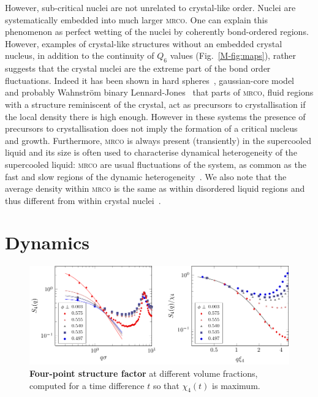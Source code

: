 \documentclass[prl,twocolumn,notitlepage]{revtex4-1}
\begin{document}
However, sub-critical nuclei are not unrelated to crystal-like order. Nuclei are systematically embedded into much larger \textsc{mrco}. One can explain this phenomenon as perfect wetting of the nuclei by coherently bond-ordered regions. However, examples of crystal-like structures without an embedded crystal nucleus, in addition to the continuity of $Q_6$ values (Fig.~\ref{M-fig:maps}), rather suggests that the crystal nuclei are the extreme part of the bond order fluctuations. Indeed it has been shown in hard spheres~\cite{OMalley2005, Schilling2010, Kawasaki2010c, Russo2011}, gaussian-core model~\cite{Russo2012} and probably Wahnstr\"om binary Lennard-Jones~\cite{Pedersen2010} that parts of \textsc{mrco}, fluid regions with a structure reminiscent of the crystal, act as precursors to crystallisation if the local density there is high enough. However in these systems the presence of precursors to crystallisation does not imply the formation of a critical nucleus and growth. Furthermore, \textsc{mrco} is always present (transiently) in the supercooled liquid and its size is often used to characterise dynamical heterogeneity of the supercooled liquid: \textsc{mrco} are usual fluctuations of the system, as common as the fast and slow regions of the dynamic heterogeneity~\cite{tanaka2010critical}. We also note that the average density within \textsc{mrco} is the same as within disordered liquid regions and thus different from within crystal nuclei~\cite{Kawasaki2010c}.

\section*{Dynamics}

\begin{figure}
\begin{center}
\includegraphics{generate_figures-figure8.pdf}
\end{center}
\caption{\textbf{Four-point structure factor} at different volume fractions, computed for a time difference $t$ so that $\chi_4(t)$ is maximum.}
	\label{fig:S4}
\end{figure}
\end{document}
